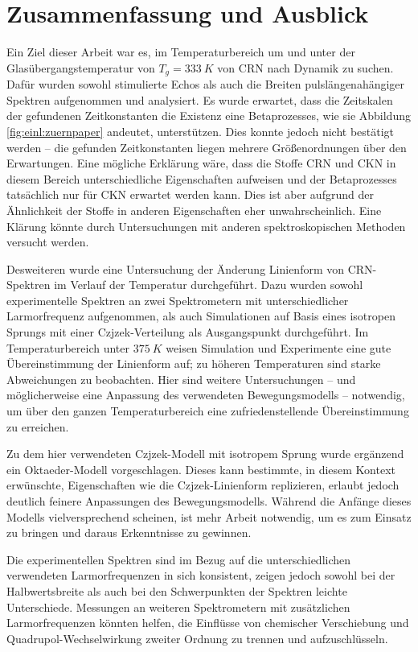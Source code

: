 \chapter{Zusammenfassung und Ausblick}

Ein Ziel dieser Arbeit war es, im Temperaturbereich um und unter der Glasübergangstemperatur von $T_g = \SI{333}{K}$ von CRN nach Dynamik zu suchen. Dafür wurden sowohl stimulierte Echos als auch die Breiten pulslängenahängiger Spektren aufgenommen und analysiert. Es wurde erwartet, dass die Zeitskalen der gefundenen Zeitkonstanten die Existenz eine Betaprozesses, wie sie Abbildung \ref{fig:einl:zuernpaper} andeutet, unterstützen. Dies konnte jedoch nicht bestätigt werden -- die gefunden Zeitkonstanten liegen mehrere Größenordnungen über den Erwartungen. Eine mögliche Erklärung wäre, dass die Stoffe CRN und CKN in diesem Bereich unterschiedliche Eigenschaften aufweisen und der Betaprozesses tatsächlich nur für CKN erwartet werden kann. Dies ist aber aufgrund der Ähnlichkeit der Stoffe in anderen Eigenschaften eher unwahrscheinlich. Eine Klärung könnte durch Untersuchungen mit anderen spektroskopischen Methoden versucht werden.

Desweiteren wurde eine Untersuchung der Änderung Linienform von CRN-Spektren im Verlauf der Temperatur durchgeführt. Dazu wurden sowohl experimentelle Spektren an zwei Spektrometern mit unterschiedlicher Larmorfrequenz aufgenommen, als auch Simulationen auf Basis eines isotropen Sprungs mit einer Czjzek-Verteilung als Ausgangspunkt durchgeführt. Im Temperaturbereich unter $\SI{375}{K}$ weisen Simulation und Experimente eine gute Übereinstimmung der Linienform auf; zu höheren Temperaturen sind starke Abweichungen zu beobachten. Hier sind weitere Untersuchungen -- und möglicherweise eine Anpassung des verwendeten Bewegungsmodells -- notwendig, um über den ganzen Temperaturbereich eine zufriedenstellende Übereinstimmung zu erreichen.

Zu dem hier verwendeten Czjzek-Modell mit isotropem Sprung wurde ergänzend ein Oktaeder-Modell vorgeschlagen. Dieses kann bestimmte, in diesem Kontext erwünschte, Eigenschaften wie die Czjzek-Linienform replizieren, erlaubt jedoch deutlich feinere Anpassungen des Bewegungsmodells. Während die Anfänge dieses Modells vielversprechend scheinen, ist mehr Arbeit notwendig, um es zum Einsatz zu bringen und daraus Erkenntnisse zu gewinnen.

Die experimentellen Spektren sind im Bezug auf die unterschiedlichen verwendeten Larmorfrequenzen in sich konsistent, zeigen jedoch sowohl bei der Halbwertsbreite als auch bei den Schwerpunkten der Spektren leichte Unterschiede. Messungen an weiteren Spektrometern mit zusätzlichen Larmorfrequenzen könnten helfen, die Einflüsse von chemischer Verschiebung und Quadrupol-Wechselwirkung zweiter Ordnung zu trennen und aufzuschlüsseln. 

